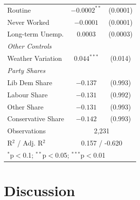 \documentclass[preprint]{elsarticle} %
\begin{document}
\begin{table}[htbp]
\begin{tabular}{lcc}
		\hspace{3mm}Routine & $-0.0002^{**}$ & (0.0001) \\
		\hspace{3mm}Never Worked & $-0.0001$ & (0.0001) \\
		\hspace{3mm}Long-term Unemp. & $0.0003$ & (0.0003) \\
		\textit{Other Controls} \\
		\hspace{3mm}Weather Variation & $0.044^{***}$ & (0.014) \\
		\textit{Party Shares} \\
		\hspace{3mm}Lib Dem Share & $-0.137$ & (0.993) \\
		\hspace{3mm}Labour Share & $-0.131$ & (0.992) \\
		\hspace{3mm}Other Share & $-0.131$ & (0.993) \\
		\hspace{3mm}Conservative Share & $-0.142$ & (0.993) \\
		\midrule
		Observations & \multicolumn{2}{c}{2,231} \\
		R$^2$ / Adj. R$^2$ & \multicolumn{2}{c}{0.157 / -0.620} \\
		\bottomrule
		\multicolumn{3}{l}{\footnotesize{$^{*}$p$<$0.1; $^{**}$p$<$0.05; $^{***}$p$<$0.01}} \\
	\end{tabular}
\end{table}



\newpage



\section{Discussion}
\end{document}
